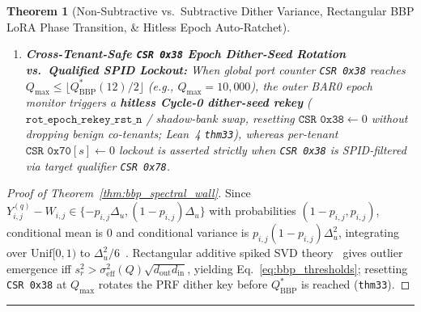 \documentclass[10pt,twocolumn]{article}
\newcommand{\MidConnesRule}{%
  \par\vspace{4pt}\noindent\textcolor{black!25}{\rule{\textwidth}{0.4pt}}\par\vspace{4pt}%
}
\theoremstyle{spectralthm}
\newtheorem{theorem}{Theorem}[section]
\begin{document}
\begin{theorem}[Non-Subtractive vs.\ Subtractive Dither Variance, Rectangular BBP LoRA Phase Transition, \& Hitless Epoch Auto-Ratchet]
\begin{enumerate}
  \begin{equation}
  \label{eq:bbp_thresholds}
  Q > Q_{\mathrm{BBP}}^*\bigl(c_{\mathrm{div}}\bigr) := \frac{\Delta_u^2 \sqrt{d_{\mathrm{out}} d_{\mathrm{in}}}}{c_{\mathrm{div}}\,s_r^2},
  \qquad
  Q_{\mathrm{Weyl}}^*\bigl(c_{\mathrm{div}}\bigr) := \frac{4\,\Delta_u^2 \bigl(\sqrt{d_{\mathrm{out}}} + \sqrt{d_{\mathrm{in}}}\bigr)^2}{c_{\mathrm{div}}\,s_r^2},
  \end{equation}
  yielding at $d_{\mathrm{out}} = d_{\mathrm{in}} = 4096$, $\Delta_9 = 128\text{~ULP}$, $s_r = 16\text{~ULP}$: $Q_{\mathrm{BBP}}^*(12) = 21,845.33$ under conservative $\sigma_{\mathrm{sub}}^2$ ($c_{\mathrm{div}}=12$) and $Q_{\mathrm{BBP}}^*(6) = 43,690.67$ under non-subtractive $\sigma_{\mathrm{avg}}^2$ ($c_{\mathrm{div}}=6$); for all $Q \le Q_{\mathrm{BBP}}^*$, $|\langle \hat{u}_r, u_r \rangle|^2 \xrightarrow{\mathrm{a.s.}} 0$; and
  \item[(iii)] \textbf{Cross-Tenant-Safe \texttt{CSR 0x38} Epoch Dither-Seed Rotation vs.\ Qualified SPID Lockout:} When global port counter \texttt{CSR 0x38} reaches $Q_{\max} \le \lfloor Q_{\mathrm{BBP}}^*(12)/2 \rfloor$ (e.g., $Q_{\max} = 10,000$), the outer BAR0 epoch monitor triggers a \textbf{hitless Cycle-0 dither-seed rekey} ($\texttt{rot\_epoch\_rekey\_rst\_n}$ / shadow-bank swap, resetting $\texttt{CSR 0x38} \leftarrow 0$ without dropping benign co-tenants; Lean~4 \texttt{thm33}), whereas per-tenant $\texttt{CSR 0x70}[s] \leftarrow 0$ lockout is asserted strictly when \texttt{CSR 0x38} is SPID-filtered via target qualifier \texttt{CSR 0x78}.
\end{enumerate}
\end{theorem}
\begin{proof}[Proof of Theorem~\ref{thm:bbp_spectral_wall}]
Since $Y_{i,j}^{(q)} - W_{i,j} \in \{-p_{i,j}\Delta_u, (1-p_{i,j})\Delta_u\}$ with probabilities $(1-p_{i,j}, p_{i,j})$, conditional mean is $0$ and conditional variance is $p_{i,j}(1-p_{i,j})\Delta_u^2$, integrating over $\mathrm{Unif}[0,1)$ to $\Delta_u^2/6$~\cite{wannamaker2000nonsubtractive}. Rectangular additive spiked SVD theory~\cite{baik2005phase,benaych2012singular,gavish2014optimal} gives outlier emergence iff $s_r^2 > \sigma_{\mathrm{eff}}^2(Q)\sqrt{d_{\mathrm{out}}d_{\mathrm{in}}}$, yielding Eq.~\eqref{eq:bbp_thresholds}; resetting \texttt{CSR 0x38} at $Q_{\max}$ rotates the PRF dither key before $Q_{\mathrm{BBP}}^*$ is reached (\texttt{thm33}).
\end{proof}
\MidConnesRule
\end{document}
